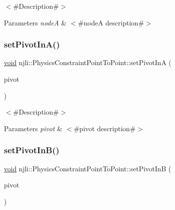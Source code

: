 $<$\#\+Description\#$>$


\begin{DoxyParams}{Parameters}
{\em nodeA} & $<$\#nodeA description\#$>$ \\
\hline
\end{DoxyParams}
\mbox{\label{classnjli_1_1_physics_constraint_point_to_point_a22513468676e92e523caea9e7c0e5ae7}} 
\subsubsection{\texorpdfstring{set\+Pivot\+In\+A()}{setPivotInA()}}
{\footnotesize\ttfamily \mbox{\hyperlink{_thread_8h_af1e856da2e658414cb2456cb6f7ebc66}{void}} njli\+::\+Physics\+Constraint\+Point\+To\+Point\+::set\+Pivot\+InA (\begin{DoxyParamCaption}\item[{const bt\+Vector3 \&}]{pivot }\end{DoxyParamCaption})}

$<$\#\+Description\#$>$


\begin{DoxyParams}{Parameters}
{\em pivot} & $<$\#pivot description\#$>$ \\
\hline
\end{DoxyParams}
\mbox{\label{classnjli_1_1_physics_constraint_point_to_point_aab12a17b9530cd91700860c6e8e1fc3e}} 
\subsubsection{\texorpdfstring{set\+Pivot\+In\+B()}{setPivotInB()}}
{\footnotesize\ttfamily \mbox{\hyperlink{_thread_8h_af1e856da2e658414cb2456cb6f7ebc66}{void}} njli\+::\+Physics\+Constraint\+Point\+To\+Point\+::set\+Pivot\+InB (\begin{DoxyParamCaption}\item[{const bt\+Vector3 \&}]{pivot }\end{DoxyParamCaption})}

